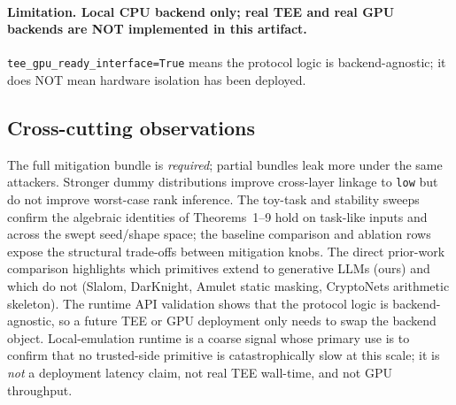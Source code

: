 \paragraph{Limitation. Local CPU backend only; real TEE and real GPU backends are NOT implemented in this artifact.} \texttt{tee\_gpu\_ready\_interface=True} means the protocol logic is backend-agnostic; it does NOT mean hardware isolation has been deployed.



\subsection{Cross-cutting observations}
\label{sec:eval:summary}
The full mitigation bundle is \emph{required}; partial bundles leak more under the same attackers. Stronger dummy distributions improve cross-layer linkage to \texttt{low} but do not improve worst-case rank inference. The toy-task and stability sweeps confirm the algebraic identities of Theorems~1--9 hold on task-like inputs and across the swept seed/shape space; the baseline comparison and ablation rows expose the structural trade-offs between mitigation knobs. The direct prior-work comparison highlights which primitives extend to generative LLMs (ours) and which do not (Slalom, DarKnight, Amulet static masking, CryptoNets arithmetic skeleton). The runtime API validation shows that the protocol logic is backend-agnostic, so a future TEE or GPU deployment only needs to swap the backend object. Local-emulation runtime is a coarse signal whose primary use is to confirm that no trusted-side primitive is catastrophically slow at this scale; it is \emph{not} a deployment latency claim, not real TEE wall-time, and not GPU throughput.
